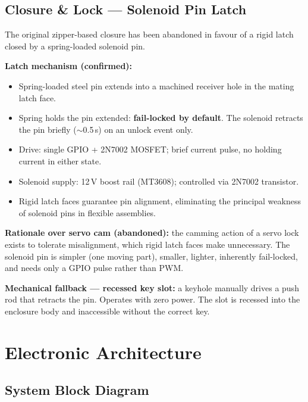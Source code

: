 \documentclass[11pt,a4paper]{article}
\begin{document}
\subsection{Closure \& Lock --- Solenoid Pin Latch}

The original zipper-based closure has been abandoned in favour of a rigid latch closed by a spring-loaded solenoid pin.

\textbf{Latch mechanism (confirmed):}
\begin{itemize}
  \item Spring-loaded steel pin extends into a machined receiver hole in the mating latch face.
  \item Spring holds the pin extended: \textbf{fail-locked by default}. The solenoid retracts the pin briefly ($\sim$0.5\,s) on an unlock event only.
  \item Drive: single GPIO + 2N7002 MOSFET; brief current pulse, no holding current in either state.
  \item Solenoid supply: 12\,V boost rail (MT3608); controlled via 2N7002 transistor.
  \item Rigid latch faces guarantee pin alignment, eliminating the principal weakness of solenoid pins in flexible assemblies.
\end{itemize}

\textbf{Rationale over servo cam (abandoned):} the camming action of a servo lock exists to tolerate misalignment, which rigid latch faces make unnecessary. The solenoid pin is simpler (one moving part), smaller, lighter, inherently fail-locked, and needs only a GPIO pulse rather than PWM.

\textbf{Mechanical fallback --- recessed key slot:} a keyhole manually drives a push rod that retracts the pin. Operates with zero power. The slot is recessed into the enclosure body and inaccessible without the correct key.

\section{Electronic Architecture}

\subsection{System Block Diagram}
\end{document}
